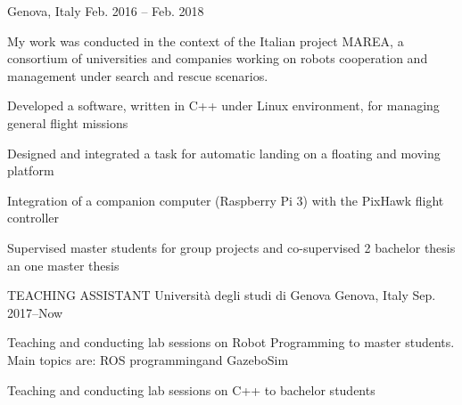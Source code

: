 \begin{cventries}
    {Genova, Italy} %
    {Feb. 2016 – Feb. 2018} %
    {
      \begin{cvparagraph}
      My work was conducted in the context of the Italian project MAREA, a consortium of universities and companies working on robots cooperation and management under search and rescue scenarios.
      \end{cvparagraph}
      \begin{cvitems} %
        \item {Developed a software, written in C++ under Linux environment, for managing general flight missions}
        \item {Designed and integrated a task for  automatic landing on a floating and moving platform}
        \item {Integration of a companion computer (Raspberry Pi 3) with the PixHawk flight controller}
        \item {Supervised master students for group projects and co-supervised 2 bachelor thesis an one master thesis}
     \end{cvitems}
    }

  \cventry
    {TEACHING ASSISTANT} %
    {Università degli studi di Genova} %
    {Genova, Italy} %
    {Sep. 2017–Now} %
    {
      \begin{cvitems} %
        \item {Teaching and conducting lab sessions on Robot Programming to master students. Main topics are: ROS programmingand GazeboSim}
        \item {Teaching and conducting lab sessions on C++ to bachelor students}
      \end{cvitems}
    }


\end{cventries}
